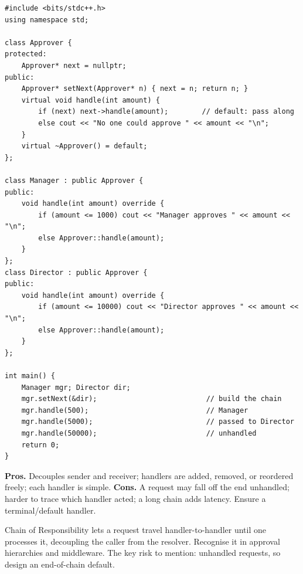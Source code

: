 \begin{lstlisting}
#include <bits/stdc++.h>
using namespace std;

class Approver {
protected:
    Approver* next = nullptr;
public:
    Approver* setNext(Approver* n) { next = n; return n; }
    virtual void handle(int amount) {
        if (next) next->handle(amount);        // default: pass along
        else cout << "No one could approve " << amount << "\n";
    }
    virtual ~Approver() = default;
};

class Manager : public Approver {
public:
    void handle(int amount) override {
        if (amount <= 1000) cout << "Manager approves " << amount << "\n";
        else Approver::handle(amount);
    }
};
class Director : public Approver {
public:
    void handle(int amount) override {
        if (amount <= 10000) cout << "Director approves " << amount << "\n";
        else Approver::handle(amount);
    }
};

int main() {
    Manager mgr; Director dir;
    mgr.setNext(&dir);                          // build the chain
    mgr.handle(500);                            // Manager
    mgr.handle(5000);                           // passed to Director
    mgr.handle(50000);                          // unhandled
    return 0;
}
\end{lstlisting}

\begin{complexitybox}
\textbf{Pros.} Decouples sender and receiver; handlers are added,
removed, or reordered freely; each handler is simple. \textbf{Cons.} A
request may fall off the end unhandled; harder to trace which handler
acted; a long chain adds latency. Ensure a terminal/default handler.
\end{complexitybox}

\begin{takeawaybox}
Chain of Responsibility lets a request travel handler-to-handler until one
processes it, decoupling the caller from the resolver. Recognise it in
approval hierarchies and middleware. The key risk to mention: unhandled
requests, so design an end-of-chain default.
\end{takeawaybox}
